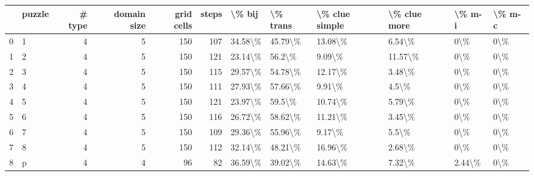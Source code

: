 \begin{tabular}{llrrrrllllll}
\toprule
{} & puzzle &  \# type &  domain size &  grid cells &  steps &   \textbackslash \% bij & \textbackslash \% trans & \textbackslash \% clue simple & \textbackslash \% clue more &  \textbackslash \% m-i & \textbackslash \% m-c \\
\midrule
0 &      1 &       4 &            5 &         150 &    107 &  34.58\textbackslash \% &  45.79\textbackslash \% &        13.08\textbackslash \% &       6.54\textbackslash \% &     0\textbackslash \% &    0\textbackslash \% \\
1 &      2 &       4 &            5 &         150 &    121 &  23.14\textbackslash \% &   56.2\textbackslash \% &         9.09\textbackslash \% &      11.57\textbackslash \% &     0\textbackslash \% &    0\textbackslash \% \\
2 &      3 &       4 &            5 &         150 &    115 &  29.57\textbackslash \% &  54.78\textbackslash \% &        12.17\textbackslash \% &       3.48\textbackslash \% &     0\textbackslash \% &    0\textbackslash \% \\
3 &      4 &       4 &            5 &         150 &    111 &  27.93\textbackslash \% &  57.66\textbackslash \% &         9.91\textbackslash \% &        4.5\textbackslash \% &     0\textbackslash \% &    0\textbackslash \% \\
4 &      5 &       4 &            5 &         150 &    121 &  23.97\textbackslash \% &   59.5\textbackslash \% &        10.74\textbackslash \% &       5.79\textbackslash \% &     0\textbackslash \% &    0\textbackslash \% \\
5 &      6 &       4 &            5 &         150 &    116 &  26.72\textbackslash \% &  58.62\textbackslash \% &        11.21\textbackslash \% &       3.45\textbackslash \% &     0\textbackslash \% &    0\textbackslash \% \\
6 &      7 &       4 &            5 &         150 &    109 &  29.36\textbackslash \% &  55.96\textbackslash \% &         9.17\textbackslash \% &        5.5\textbackslash \% &     0\textbackslash \% &    0\textbackslash \% \\
7 &      8 &       4 &            5 &         150 &    112 &  32.14\textbackslash \% &  48.21\textbackslash \% &        16.96\textbackslash \% &       2.68\textbackslash \% &     0\textbackslash \% &    0\textbackslash \% \\
8 &      p &       4 &            4 &          96 &     82 &  36.59\textbackslash \% &  39.02\textbackslash \% &        14.63\textbackslash \% &       7.32\textbackslash \% &  2.44\textbackslash \% &    0\textbackslash \% \\
\bottomrule
\end{tabular}
